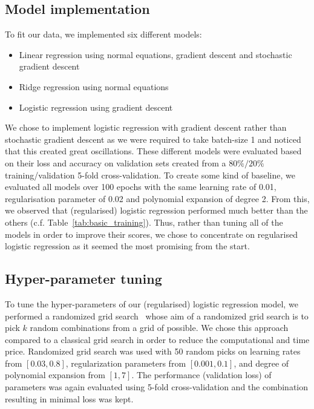 \documentclass[10pt,conference,compsocconf]{IEEEtran}
\begin{document}
  \subsection{
  Model implementation
  }\label{subsec:model_impl}
  To fit our data, we implemented six different models: 
    \begin{itemize}
        \item Linear regression using normal equations, gradient descent and stochastic gradient descent 
        \item Ridge regression using normal equations
        \item Logistic regression using gradient descent 
    \end{itemize}
    We chose to implement logistic regression with gradient descent rather than stochastic gradient descent as we were required to take batch-size 1 and noticed that this created great oscillations. \newline
    These different models were evaluated based on their loss and accuracy on validation sets created from a $80\%/20\%$ training/validation 5-fold cross-validation. To create some kind of baseline, we evaluated all models over 100 epochs with the same learning rate of 0.01, regularisation parameter of 0.02 and polynomial expansion of degree 2. From this, we observed that (regularised) logistic regression performed much better than the others (c.f. Table~\ref{tab:basic_training}). Thus, rather than tuning all of the models in order to improve their scores, we chose to concentrate on regularised logistic regression as it seemed the most promising from the start. 
    
    \subsection{Hyper-parameter tuning}\label{subsubsec: parameter_tuning}
    To tune the hyper-parameters of our (regularised) logistic regression model, we performed a randomized grid search~\cite{jonasbenner2019} whose aim of a randomized grid search is to pick $k$ random combinations from a grid of possible. We chose this approach compared to a classical grid search in order to reduce the computational and time price. Randomized grid search was used with 50 random picks on learning rates from  $[0.03,0.8]$, regularization parameters from $[0.001,0.1]$, and degree of polynomial expansion from $[1,7]$. The performance (validation loss) of parameters was again evaluated using 5-fold cross-validation and the combination resulting in minimal loss was kept.
    
\end{document}
